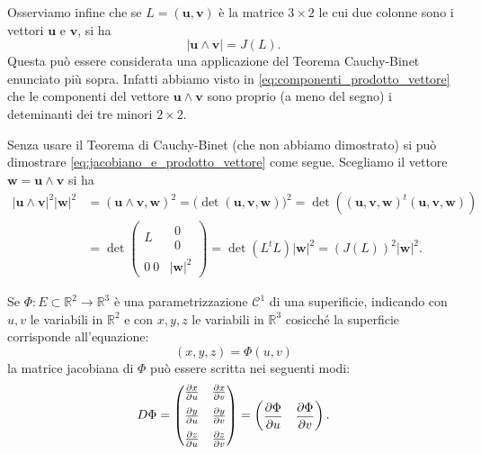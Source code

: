 \documentclass[italian,a4paper]{scrartcl}
\newcommand{\RR}{{\mathbb R}}
\renewcommand{\vec}{\mathbf}
\begin{document}
Osserviamo infine che se $L=(\vec u,\vec v)$ è la matrice $3\times 2$ le cui due
colonne sono i vettori $\vec u$ e $\vec v$, si ha
\begin{equation}\label{eq:jacobiano_e_prodotto_vettore}
  \lvert \vec u\wedge \vec v \rvert = J(L).
\end{equation}
Questa può essere considerata una applicazione del Teorema
Cauchy-Binet enunciato più sopra. Infatti abbiamo visto in 
\eqref{eq:componenti_prodotto_vettore} che le
componenti del vettore $\vec u \wedge \vec v$ sono proprio (a meno del
segno) i deteminanti dei tre minori $2\times 2$.

Senza usare il Teorema di Cauchy-Binet (che non abbiamo dimostrato)
si può dimostrare \eqref{eq:jacobiano_e_prodotto_vettore} come segue.
Scegliamo il vettore $\vec w = \vec u \wedge \vec v$ 
si ha 
\begin{align*}
\lvert \vec u\wedge \vec v\rvert^2 \lvert \vec w \rvert ^2 
&=
(\vec u \wedge \vec v, \vec w)^2
=\big(\det(\vec u, \vec v, \vec w)\big)^2 
=
\det \left((\vec u,\vec v,\vec w)^t (\vec u,\vec v,\vec w)\right) 
\\
&=
\det
\begin{pmatrix}
  L & \begin{array}{c}0\\0\end{array} \\
  0 \  0 & \lvert \vec w\rvert^2
\end{pmatrix}
= \det (L^t L) \lvert \vec w\rvert^2
= (J(L))^2 \lvert \vec w \rvert^2.
\end{align*}

Se $\Phi\colon E\subset \RR^2 \to \RR^3$ è una parametrizzazione
$\mathcal C^1$ di una superificie, indicando con $u,v$ le variabili in
$\RR^2$ e con $x,y,z$ le variabili in $\RR^3$ cosicché la superficie
corrisponde all'equazione:
\[
 (x,y,z) = \Phi(u,v)
\]
la matrice jacobiana di $\Phi$ può essere scritta nei seguenti modi:
\[
D\Phi = 
\begin{pmatrix}
\frac{\partial x}{\partial u} & \frac{\partial x}{\partial v} \medskip\\
\frac{\partial y}{\partial u} & \frac{\partial y}{\partial v} \medskip\\
\frac{\partial z}{\partial u} & \frac{\partial z}{\partial v}
\end{pmatrix}
=
\begin{pmatrix}
\displaystyle
\frac{\partial \Phi}{\partial u} &
\displaystyle
\frac{\partial \Phi}{\partial v}
\end{pmatrix}.
\]
\end{document}
